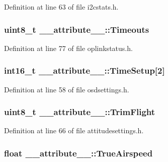 \-Definition at line 63 of file i2cstats.\-h.

\hypertarget{struct____attribute_____aa3341743a43a6a4c6758f81f7b3bb137}{
\subsubsection[{\-Timeouts}]{\setlength{\rightskip}{0pt plus 5cm}uint8\-\_\-t {\bf \-\_\-\-\_\-attribute\-\_\-\-\_\-\-::\-Timeouts}}}\label{struct____attribute_____aa3341743a43a6a4c6758f81f7b3bb137}


\-Definition at line 77 of file oplinkstatus.\-h.

\hypertarget{struct____attribute_____ac3c19ead2f560240048d967415add527}{
\subsubsection[{\-Time\-Setup}]{\setlength{\rightskip}{0pt plus 5cm}int16\-\_\-t {\bf \-\_\-\-\_\-attribute\-\_\-\-\_\-\-::\-Time\-Setup}\mbox{[}2\mbox{]}}}\label{struct____attribute_____ac3c19ead2f560240048d967415add527}


\-Definition at line 58 of file osdsettings.\-h.

\hypertarget{struct____attribute_____a15b22f4f1045d631030da99243000d5e}{
\subsubsection[{\-Trim\-Flight}]{\setlength{\rightskip}{0pt plus 5cm}uint8\-\_\-t {\bf \-\_\-\-\_\-attribute\-\_\-\-\_\-\-::\-Trim\-Flight}}}\label{struct____attribute_____a15b22f4f1045d631030da99243000d5e}


\-Definition at line 66 of file attitudesettings.\-h.

\hypertarget{struct____attribute_____a451e2ea5b7d09b29c20075f5579bd032}{
\subsubsection[{\-True\-Airspeed}]{\setlength{\rightskip}{0pt plus 5cm}float {\bf \-\_\-\-\_\-attribute\-\_\-\-\_\-\-::\-True\-Airspeed}}}\label{struct____attribute_____a451e2ea5b7d09b29c20075f5579bd032}


